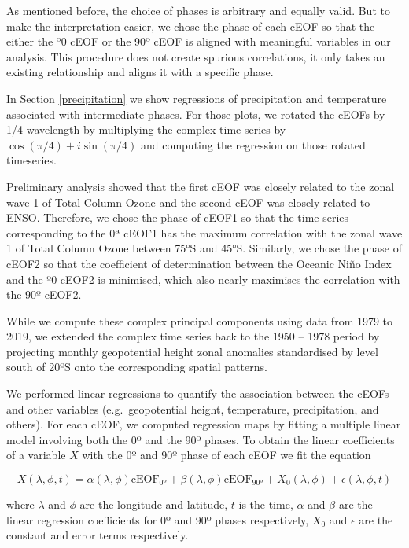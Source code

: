 \documentclass[pdflatex,sn-basic]{sn-jnl}
\theoremstyle{thmstyleone}%
\theoremstyle{thmstyletwo}%
\theoremstyle{thmstylethree}%
\begin{document}
As mentioned before, the choice of phases is arbitrary and equally valid.
But to make the interpretation easier, we chose the phase of each cEOF so that the either the º0 cEOF or the 90º cEOF is aligned with meaningful variables in our analysis.
This procedure does not create spurious correlations, it only takes an existing relationship and aligns it with a specific phase.

In Section \ref{precipitation} we show regressions of precipitation and temperature associated with intermediate phases.
For those plots, we rotated the cEOFs by 1/4 wavelength by multiplying the complex time series by \(\cos(\pi/4) + i\sin(\pi/4)\) and computing the regression on those rotated timeseries.

Preliminary analysis showed that the first cEOF was closely related to the zonal wave 1 of Total Column Ozone and the second cEOF was closely related to ENSO.
Therefore, we chose the phase of cEOF1 so that the time series corresponding to the 0ª cEOF1 has the maximum correlation with the zonal wave 1 of Total Column Ozone between 75°S and 45°S.
Similarly, we chose the phase of cEOF2 so that the coefficient of determination between the Oceanic Niño Index \citep{bamston1997} and the º0 cEOF2 is minimised, which also nearly maximises the correlation with the 90º cEOF2.

While we compute these complex principal components using data from 1979 to 2019, we extended the complex time series back to the 1950 -- 1978 period by projecting monthly geopotential height zonal anomalies standardised by level south of 20ºS onto the corresponding spatial patterns.

We performed linear regressions to quantify the association between the cEOFs and other variables (e.g.~geopotential height, temperature, precipitation, and others).
For each cEOF, we computed regression maps by fitting a multiple linear model involving both the 0º and the 90º phases.
To obtain the linear coefficients of a variable \(X\) with the 0º and 90º phase of each cEOF we fit the equation

\[
X(\lambda, \phi, t) = \alpha(\lambda, \phi) \operatorname{cEOF_{0º}} + \beta(\lambda, \phi) \operatorname{cEOF_{90º}} + X_0(\lambda, \phi) + \epsilon(\lambda, \phi, t)
\]

where \(\lambda\) and \(\phi\) are the longitude and latitude, \(t\) is the time, \(\alpha\) and \(\beta\) are the linear regression coefficients for 0º and 90º phases respectively, \(X_0\) and \(\epsilon\) are the constant and error terms respectively.
\end{document}
